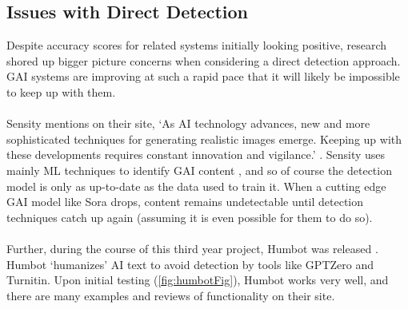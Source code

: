 \documentclass[12pt,a4paper]{article}
\begin{document}
\subsection{Issues with Direct Detection}
Despite accuracy scores for related systems initially looking positive, research shored up bigger picture concerns when considering a direct detection approach. GAI systems are improving at such a rapid pace that it will likely be impossible to keep up with them. 
\\\\Sensity mentions on their site, `As AI technology advances, new and more sophisticated techniques for generating realistic images emerge. Keeping up with these developments requires constant innovation and vigilance.' \cite{sensityBlog}. Sensity uses mainly ML techniques to identify GAI content \cite{sensityBlog}, and so of course the detection model is only as up-to-date as the data used to train it. When a cutting edge GAI model like Sora drops, content remains undetectable until detection techniques catch up again (assuming it is even possible for them to do so). \\\\Further, during the course of this third year project, Humbot was released \cite{humbot}. Humbot `humanizes' AI text to avoid detection by tools like GPTZero and Turnitin. Upon initial testing (\ref{fig:humbotFig}), Humbot works very well, and there are many examples and reviews of functionality on their site.  
\end{document}
